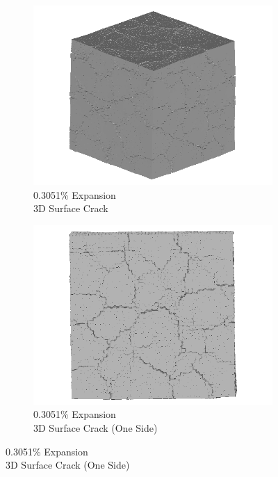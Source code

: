 \begin{figure}[ht!]
    \begin{subfigure}{.5\textwidth}
      \centering
      \includegraphics[width=0.5\linewidth]{Files/exp_3D/ASR/A15P75_3_3d.png}
      \caption{0.3051\% Expansion\\3D Surface Crack}
    \end{subfigure}%
    \begin{subfigure}{.5\textwidth}
      \centering
      \includegraphics[width=0.5\linewidth]{Files/exp_3D/ASR/A15P75_3_3ds.png}
      \caption{0.3051\% Expansion\\3D Surface Crack (One Side)}
    \end{subfigure}%


\end{figure}
